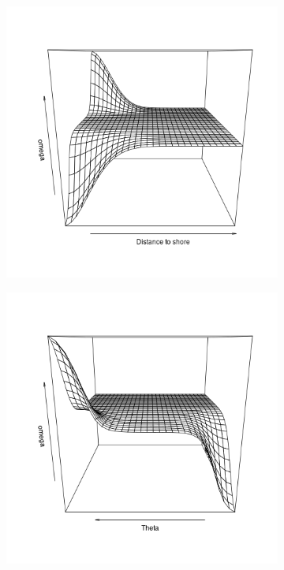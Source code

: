 \documentclass[11pt]{article}
\newcommand {\1}{\mathbb{1}}
\begin{document}
\begin{figure}[H]
	\centering
	\begin{subfigure}{0.48\textwidth}
		\centering
		\includegraphics[scale=0.3]{images/crcvm/smooth_omega1.png}
		\caption{}
		\label{fig: smoothomega1}
	\end{subfigure}
	\begin{subfigure}{0.48\textwidth}
		\centering
		\includegraphics[scale=0.3]{images/crcvm/smooth_omega2.png}
		\caption{}
	\label{fig: smoothomega2}
	\end{subfigure}


\end{figure}
\end{document}
